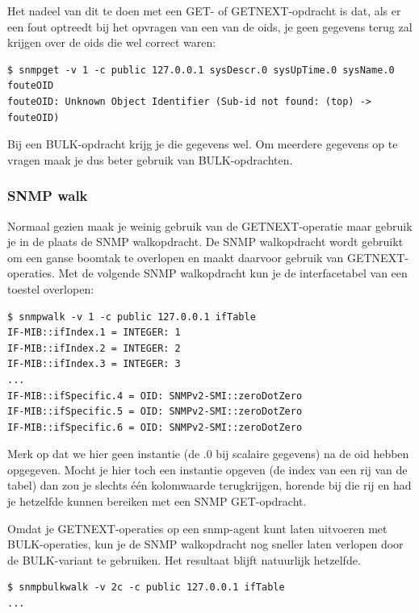 Het nadeel van dit te doen met een GET- of GETNEXT-opdracht is dat, als er een fout optreedt bij het opvragen
van een van de \glspl{oid}, je geen gegevens terug zal krijgen over de \glspl{oid} die wel correct waren:

\begin{lstlisting}[float=h, caption={Meerdere gegevens opvragen met SNMP GET met een foute OID}, label=netsnmp-get-meerdere-fout]
$ snmpget -v 1 -c public 127.0.0.1 sysDescr.0 sysUpTime.0 sysName.0 fouteOID
fouteOID: Unknown Object Identifier (Sub-id not found: (top) -> fouteOID)
\end{lstlisting}

Bij een BULK-opdracht krijg je die gegevens wel.
Om meerdere gegevens op te vragen maak je dus beter gebruik van BULK-opdrachten.


\subsubsection{SNMP walk}
\label{snmp-walk}

Normaal gezien maak je weinig gebruik van de GETNEXT-operatie maar gebruik je in de plaats de SNMP walkopdracht.
De SNMP walkopdracht wordt gebruikt om een ganse boomtak te overlopen en maakt daarvoor gebruik van GETNEXT-operaties.
Met de volgende SNMP walkopdracht kun je de interfacetabel van een toestel overlopen:

\begin{lstlisting}[caption={SNMP walkopdracht}, label=netsnmp-walk]
$ snmpwalk -v 1 -c public 127.0.0.1 ifTable
IF-MIB::ifIndex.1 = INTEGER: 1
IF-MIB::ifIndex.2 = INTEGER: 2
IF-MIB::ifIndex.3 = INTEGER: 3
...
IF-MIB::ifSpecific.4 = OID: SNMPv2-SMI::zeroDotZero
IF-MIB::ifSpecific.5 = OID: SNMPv2-SMI::zeroDotZero
IF-MIB::ifSpecific.6 = OID: SNMPv2-SMI::zeroDotZero
\end{lstlisting}

Merk op dat we hier geen instantie (de .0 bij scalaire gegevens) na de \gls{oid} hebben opgegeven.
Mocht je hier toch een instantie opgeven (de index van een rij van de tabel) dan zou je slechts één kolomwaarde terugkrijgen,
horende bij die rij en had je hetzelfde kunnen bereiken met een SNMP GET-opdracht.

Omdat je GETNEXT-operaties op een \gls{snmp-agent} kunt laten uitvoeren met BULK-operaties,
kun je de SNMP walkopdracht nog sneller laten verlopen door de BULK-variant te gebruiken.
Het resultaat blijft natuurlijk hetzelfde.

\begin{lstlisting}[caption={SNMP walkopdracht m.b.v. BULK-operaties}, label=netsnmp-bulkwalk]
$ snmpbulkwalk -v 2c -c public 127.0.0.1 ifTable
...
\end{lstlisting}

